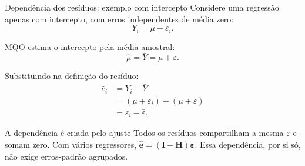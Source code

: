 \documentclass[
  ignorenonframetext,
  brazilian,
  aspectratio=169,
  10pt]{beamer}
\begin{document}
\begin{frame}{Dependência dos resíduos: exemplo com intercepto}
\protect{}\label{dependuxeancia-dos-resuxedduos-exemplo-com-intercepto}
Considere uma regressão apenas com intercepto, com erros independentes
de média zero: \[
Y_i=\mu+\varepsilon_i.
\]

MQO estima o intercepto pela média amostral: \[
\widehat\mu=\bar Y=\mu+\bar\varepsilon.
\]

Substituindo na definição do resíduo: \[
\begin{aligned}
\hat e_i&=Y_i-\bar Y\\
&=(\mu+\varepsilon_i)-(\mu+\bar\varepsilon)\\
&=\varepsilon_i-\bar\varepsilon.
\end{aligned}
\]

\begin{block}{A dependência é criada pelo ajuste}
Todos os resíduos compartilham a mesma $\bar\varepsilon$ e somam zero.
Com vários regressores, $\widehat{\mathbf e}=(\mathbf I-\mathbf H)\boldsymbol\varepsilon$.
Essa dependência, por si só, não exige erros-padrão agrupados.
\end{block}
\end{frame}
\end{document}
